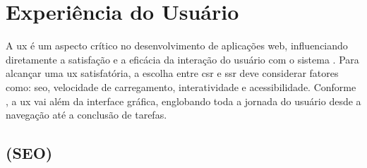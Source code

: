 

\section{Experiência do Usuário}
\label{sec:ux}
A \acrfull{ux} é um aspecto crítico no desenvolvimento de aplicações web, influenciando diretamente a satisfação e a eficácia da interação do usuário com o sistema \cite{atori2023}. Para alcançar uma \acrshort{ux} satisfatória, a escolha entre \acrshort{csr} e \acrshort{ssr} deve considerar fatores como: {\acrshort{seo}}, velocidade de carregamento, interatividade e acessibilidade.
Conforme , a \acrshort{ux} vai além da interface gráfica, englobando toda a jornada do usuário desde a navegação até a conclusão de tarefas. 

\subsection{ (SEO)}
\label{sec:seo}


